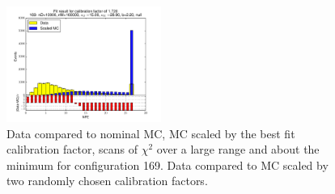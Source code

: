 \begin{figure}[htbp]
\begin{center}
\includegraphics[width=0.45\textwidth]{../FIGURES/169/FIG_Fit_result_for_calibration_factor_of_1_720.pdf} 
\caption{Data compared to nominal MC, MC scaled by the best fit calibration factor, scans of $\chi^2$ over a large range and about the minimum for configuration 169. Data compared to MC scaled by two randomly chosen calibration factors.} 
\label{tab:best_169} 
\end{center} \end{figure} 


